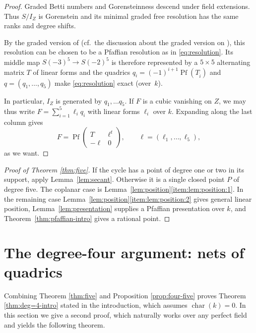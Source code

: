 \documentclass[a4paper,11pt]{amsart}
\numberwithin{equation}{section}
\theoremstyle{definition}
\theoremstyle{remark}
\DeclareMathOperator{\Pf}{Pf}
\begin{document}
\begin{proof}
Graded Betti numbers and Gorensteinness descend under field extensions.
Thus $S/I_Z$ is Gorenstein and its minimal graded free
resolution has the same ranks and degree shifts.

By the graded version of 
\cite[Theorem~2.1(2) and its proof]{BE} (cf.~the discussion about the graded version on \cite[page 466]{BE}), this resolution
can be chosen to be a Pfaffian resolution as in  \eqref{eq:resolution}.
Its middle map $S(-3)^5\to S(-2)^5$ is therefore represented
by a $5\times5$ alternating matrix $T$ of linear forms
and the quadrics $q_i=(-1)^{i+1}\Pf(T_{\widehat i})$ and
$q=(q_1,\ldots,q_5)$ make \eqref{eq:resolution} exact (over~$k$).

In particular, $I_Z$ is generated by $q_1,\dots q_5$.
If $F$ is a cubic vanishing on $Z$, we may thus write
$F=\sum_{i=1}^{5}\ell_i q_i$ with linear forms $\ell_i$ over $k$.
Expanding along the last column gives
\begin{equation}\tag{3.4}
 F=\operatorname{Pf}\begin{pmatrix}
 T & \ell^t \\
 -\ell & 0
 \end{pmatrix},
 \qquad
 \ell=(\ell_1,\ldots,\ell_5) ,
\end{equation}
as we want.  
\end{proof}





\begin{proof}[Proof of Theorem \ref{thm:five}]
If the cycle has a point of degree one or two in its support, apply
Lemma~\ref{lem:secant}. Otherwise it is a single closed point $P$ of
degree five. The coplanar case is Lemma~\ref{lem:position}\eqref{item:lem:position:1}.
In the remaining case Lemma~\ref{lem:position}\eqref{item:lem:position:2} gives general linear
position, Lemma~\ref{lem:presentation} supplies a Pfaffian presentation
over $k$, and Theorem~\ref{thm:pfaffian-intro} gives a rational point.
\end{proof}




\section{The degree-four argument: nets of quadrics} 
\label{sec:degree-four}
Combining Theorem \ref{thm:five} and Proposition \ref{prop:four-five} proves Theorem \ref{thm:deg=4-intro} stated in the introduction, which assumes $\operatorname{char}(k)=0$.
In this section we give a second proof, which naturally works over any perfect field and yields the following theorem.
\end{document}
